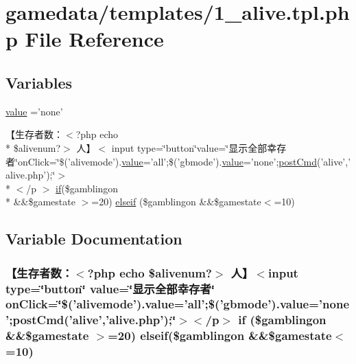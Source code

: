 \hypertarget{1__alive_8tpl_8php}{\section{gamedata/templates/1\+\_\+alive.tpl.\+php File Reference}
\label{1__alive_8tpl_8php}
}
\subsection*{Variables}
\begin{DoxyCompactItemize}
\item 
\hyperlink{1__alive_8tpl_8php_afcc7a4b78ecd8fa7e713f8cfa0f51017}{value} ='none'
\item 
【生存者数：$<$?php echo \\*
\$alivenum?$>$ 人】$<$ input type=\char`\"{}button\char`\"{}value=\char`\"{}显示全部幸存者\char`\"{}on\+Click=\char`\"{}\$('alivemode').\hyperlink{1__chat_8tpl_8php_afcc7a4b78ecd8fa7e713f8cfa0f51017}{value}='all';\$('gbmode').\hyperlink{1__chat_8tpl_8php_afcc7a4b78ecd8fa7e713f8cfa0f51017}{value}='none';\hyperlink{game20130526_8js_ae9fcb7895720a1e42282d0224da12ebf}{post\+Cmd}('alive','alive.\+php');\char`\"{}$>$\\*
$<$/p $>$ \hyperlink{login__old_8php_a4ac1118c2e44c513a674bc1793ba6c90}{if}(\$gamblingon \\*
\&\&\$gamestate $>$=20) \hyperlink{1__alive_8tpl_8php_a4b2e08b72fb4d0c4da4b2b8123ee2501}{elseif} (\$gamblingon \&\&\$gamestate$<$=10)
\end{DoxyCompactItemize}


\subsection{Variable Documentation}
\hypertarget{1__alive_8tpl_8php_a4b2e08b72fb4d0c4da4b2b8123ee2501}{
\subsubsection[{elseif}]{\setlength{\rightskip}{0pt plus 5cm}【生存者数：$<$?php echo \$alivenum?$>$ 人】$<$input type=\char`\"{}button\char`\"{} value=\char`\"{}显示全部幸存者\char`\"{} on\+Click=\char`\"{}\$('alivemode').{\bf value}='all';\$('gbmode').{\bf value}='none';{\bf post\+Cmd}('alive','alive.\+php');\char`\"{}$>$$<$/p$>$ {\bf if} (\$gamblingon \&\&\$gamestate $>$=20) elseif(\$gamblingon \&\&\$gamestate$<$=10)}}\label{1__alive_8tpl_8php_a4b2e08b72fb4d0c4da4b2b8123ee2501}


